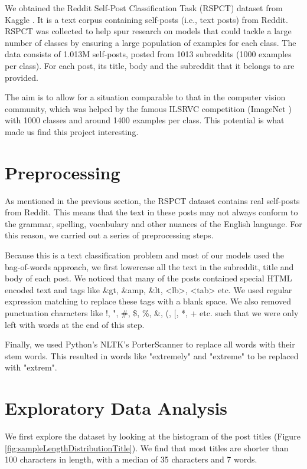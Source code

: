 \documentclass{sig-alternate-05-2015}
\begin{document}
We obtained the Reddit Self-Post Classification Task (RSPCT) dataset from Kaggle \cite{kaggle:dataset}. It is a text corpus containing self-posts (i.e., text posts) from Reddit. RSPCT was collected to help spur research on models that could tackle a large number of classes by ensuring a large population of examples for each class. The data consists of 1.013M self-posts, posted from 1013 subreddits (1000 examples per class). For each post, its title, body and the subreddit that it belongs to are provided.

The aim is to allow for a situation comparable to that in the computer vision community, which was helped by the famous ILSRVC competition (ImageNet \cite{imagenet}) with 1000 classes and around 1400 examples per class. This potential is what made us find this project interesting.

\section{Preprocessing}

As mentioned in the previous section, the RSPCT dataset contains real self-posts from Reddit. This means that the text in these posts may not always conform to the grammar, spelling, vocabulary and other nuances of the English language. For this reason, we carried out a series of preprocessing steps.

Because this is a text classification problem and most of our models used the bag-of-words approach, we first lowercase all the text in the subreddit, title and body of each post. We noticed that many of the posts contained special HTML encoded text and tags like \&gt, \&amp, \&lt, <lb>, <tab> etc. We used regular expression matching to replace these tags with a blank space. We also removed punctuation characters like !, ", \#, \$, \%, \&, (, [, *, + etc. such that we were only left with words at the end of this step.

Finally, we used Python's NLTK's PorterScanner to replace all words with their stem words. This resulted in words like "extremely" and "extreme" to be replaced with "extrem".

\section{Exploratory Data Analysis}

We first explore the dataset by looking at the histogram of the post titles (Figure \ref{fig:sampleLengthDistributionTitle}). We find that most titles are shorter than 100 characters in length, with a median of 35 characters and 7 words.
\end{document}
